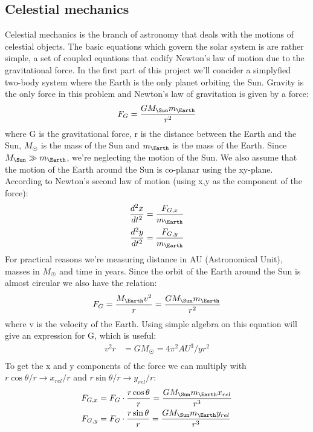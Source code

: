 \documentclass{article}
\begin{document}
\subsection{Celestial mechanics}
Celestial mechanics is the branch of astronomy that deals with the motions of celestial objects. The basic equations which govern the solar system is are rather simple, a set of coupled equations that codify Newton's law of motion due to the gravitational force. In the first part of this project we'll concider a simplyfied two-body system where the Earth is the only planet orbiting the Sun. Gravity is the only force in this problem and Newton's law of gravitation is given by a force:
\begin{align*}
  F_G &= \frac{GM_{\Sun}m_{\Earth}}{r^2}\\
\end{align*}
where G is the gravitational force, r is the distance between the Earth and the Sun, $M_{\Sun}$ is the mass of the Sun and $m_{\Earth}$ is the mass of the Earth. Since $M_{\Sun} \gg m_{\Earth}$, we're neglecting the motion of the Sun. We also assume that the motion of the Earth around the Sun is co-planar using the xy-plane.
According to Newton's second law of motion (using x,y as the component of the force):
\begin{align*}
  \frac{d^2x}{dt^2} &= \frac{F_{G,x}}{m_{\Earth}}\\
  \frac{d^2y}{dt^2} &= \frac{F_{G,y}}{m_{\Earth}}\\
\end{align*}
For practical reasons we're measuring distance in AU (Astronomical Unit), masses in $M_{\Sun}$ and time in years.
Since the orbit of the Earth around the Sun is almost circular we also have the relation:
\begin{align*}
  F_{G} &= \frac{M_{\Earth}v^2}{r} = \frac{GM_{\Sun}m_{\Earth}}{r^2}\\
\end{align*}
where v is the velocity of the Earth.
Using simple algebra on this equation will give an expression for G, which is useful:
\begin{align*}
  v^2 r &= GM_{\Sun} = 4\pi^2 AU^3/yr^2\\
\end{align*}
To get the x and y components of the force we can multiply with $r \cos\theta/r\to x_{rel}/r$ and $r \sin\theta/r\to y_{rel}/r$:
\begin{align*}
  F_{G,x} &=F_{G}\cdot \frac{r \cos\theta}{r}= \frac{GM_{\Sun}m_{\Earth} x_{rel}}{r^3}\\
  F_{G,y} &=F_{G}\cdot \frac{r \sin\theta}{r}= \frac{GM_{\Sun}m_{\Earth} y_{rel}}{r^3}\\
\end{align*}
\end{document}
